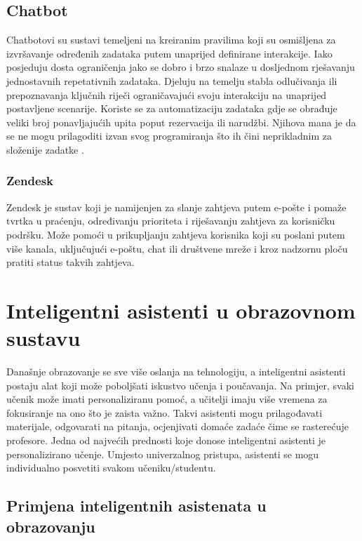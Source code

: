 \documentclass[]{foi}
\begin{document}
\subsection{Chatbot}

Chatbotovi su sustavi temeljeni na kreiranim pravilima koji su osmišljena za izvršavanje određenih zadataka putem unaprijed definirane interakcije. Iako posjeduju dosta ograničenja jako se dobro
i brzo snalaze u dosljednom rješavanju jednostavnih repetativnih zadataka. Djeluju na temelju stabla odlučivanja ili prepoznavanja ključnih riječi ograničavajući svoju interakciju na unaprijed 
postavljene scenarije. Koriste se za automatizaciju zadataka gdje se obrađuje veliki broj ponavljajućih upita poput rezervacija ili narudžbi. Njihova mana je da se ne mogu prilagoditi izvan
svog programiranja što ih čini neprikladnim za složenije zadatke \cite{exomindset2025difference}.

\subsubsection{Zendesk}

Zendesk je sustav koji je namijenjen za slanje zahtjeva putem e-pošte i pomaže tvrtka u praćenju, određivanju prioriteta i riješavanju zahtjeva za korisničku podršku.
Može pomoći u prikupljanju zahtjeva korisnika koji su poslani putem više kanala, uključujući e-poštu, chat ili društvene mreže i kroz nadzornu ploču pratiti status takvih zahtjeva.

\newpage
\section{Inteligentni asistenti u obrazovnom sustavu}

Današnje obrazovanje se sve više oslanja na tehnologiju, a inteligentni asistenti postaju alat koji može poboljšati iskustvo učenja i poučavanja. Na primjer, svaki učenik može imati
personaliziranu pomoć, a učitelji imaju više vremena za fokusiranje na ono što je zaista važno. Takvi asistenti mogu prilagođavati materijale, odgovarati na pitanja, ocjenjivati domaće zadaće
čime se rasterećuje profesore. Jedna od najvećih prednosti koje donose inteligentni asistenti je personalizirano učenje. Umjesto univerzalnog pristupa, asistenti se mogu individualno 
posvetiti svakom učeniku/studentu. 

\subsection{Primjena inteligentnih asistenata u obrazovanju}
\end{document}
